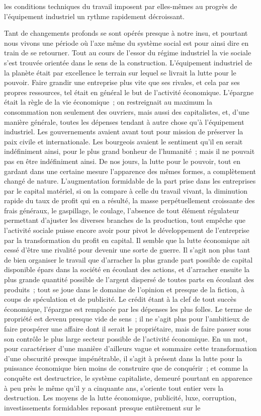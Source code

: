\documentclass[french,twoside]{book} %
\begin{document}
les conditions techniques du travail imposent par elles-mêmes au progrès de l'équipement industriel un rythme rapidement décroissant.\par
Tant de changements profonds se sont opérés presque à notre insu, et pourtant nous vivons une période où l'axe même du système social est pour ainsi dire en train de se retourner. Tout au cours de l'essor du régime industriel la vie sociale s'est trouvée orientée dans le sens de la construction. L'équipement industriel de la planète était par excellence le terrain sur lequel se livrait la lutte pour le pouvoir. Faire grandir une entreprise plus vite que ses rivales, et cela par ses propres ressources, tel était en général le but de l'activité économique. L'épargne était la règle de la vie économique ; on restreignait au maximum la consommation non seulement des ouvriers, mais aussi des capitalistes, et, d'une manière générale, toutes les dépenses tendant à autre chose qu'à l'équipement industriel. Les gouvernements avaient avant tout pour mission de préserver la paix civile et internationale. Les bourgeois avaient le sentiment qu'il en serait indéfiniment ainsi, pour le plus grand bonheur de l'humanité ; mais il ne pouvait pas en être indéfiniment ainsi. De nos jours, la lutte pour le pouvoir, tout en gardant dans une certaine mesure l'apparence des mêmes formes, a complètement changé de nature. L'augmentation formidable de la part prise dans les entreprises par le capital matériel, si on la compare à celle du travail vivant, la diminution rapide du taux de profit qui en a résulté, la masse perpétuellement croissante des frais généraux, le gaspillage, le coulage, l'absence de tout élément régulateur permettant d'ajuster les diverses branches de la production, tout empêche que l’activité sociale puisse encore avoir pour pivot le développement de l'entreprise par la transformation du profit en capital. Il semble que la lutte économique ait cessé d'être une rivalité pour devenir une sorte de guerre. Il s'agit non plus tant de bien organiser le travail que d'arracher la plus grande part possible de capital disponible épars dans la société en écoulant des actions, et d'arracher ensuite la plus grande quantité possible de l'argent dispersé de toutes parts en écoulant des produits ; tout se joue dans le domaine de l'opinion et presque de la fiction, à coups de spéculation et de publicité. Le crédit étant à la clef de tout succès économique, l'épargne est remplacée par les dépenses les plus folles. Le terme de propriété est devenu presque vide de sens ; il ne s'agit plus pour l'ambitieux de faire prospérer une affaire dont il serait le propriétaire, mais de faire passer sous son contrôle le plus large secteur possible de l'activité économique. En un mot, pour caractériser d'une manière d'ailleurs vague et sommaire cette transformation d'une obscurité presque impénétrable, il s'agit à présent dans la lutte pour la puissance économique bien moins de construire que de conquérir ; et comme la conquête est destructrice, le système capitaliste, demeuré pourtant en apparence à peu près le même qu'il y a cinquante ans, s'oriente tout entier vers la destruction. Les moyens de la lutte économique, publicité, luxe, corruption, investissements formidables reposant presque entièrement sur le 
\end{document}
